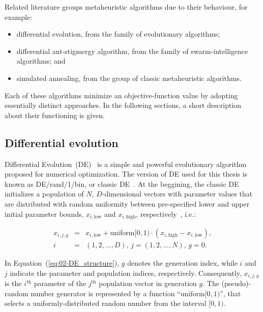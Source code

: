 \bigskip{}


Related literature groups metaheuristic algorithms due to their behaviour,
for example:
\begin{itemize}
\item differential evolution, from the family of evolutionary algorithms;
\item differential ant-stigmergy algorithm, from the family of swarm-intelligence
algorithms; and
\item simulated annealing, from the group of classic metaheuristic algorithms. 
\end{itemize}
Each of these algorithms minimize an objective-function value by adopting
essentially distinct approaches. In the following sections, a short
description about their functioning is given.


\subsection{Differential evolution \label{sub:02-DE}}

Differential Evolution~(DE)~\cite{storn1997_Differential_evolution}
is a simple and powerful evolutionary algorithm proposed for numerical
optimization. The version of DE used for this thesis is known as DE/rand/1/bin,
or \textquotedbl{}classic DE\textquotedbl{}~\cite{Price-Differential_evolution_a_practical_approach:2005}.
At the beggining, the classic DE initializes a population of $N$,
$D$-dimensional vectors with parameter values that are distributed
with random uniformity between pre-specified lower and upper initial
parameter bounds, $x_{i,\mathrm{{low}}}$ and $x_{i,\mathrm{{high}}}$,
respectively~\cite{Ronkkonen-Real_parameter_optimization_with_differential_evolution:2005},
i.e.:

\begin{eqnarray}
x_{i,j,g} & = & x_{i,\mathrm{{low}}}+\mathrm{{uniform}[0,1)}\cdot(x_{i,\mathrm{{high}}}-x_{i,\mathrm{{low}}}),\nonumber \\
i & = & (1,2,...,D),\, j=(1,2,...,N),\, g=0.\label{eq:02-DE_structure}
\end{eqnarray}


\noindent In Equation~(\ref{eq:02-DE_structure}), $g$ denotes the
generation index, while $i$ and $j$ indicate the parameter and population
indices, respectively. Consequently, $x_{i,j,g}$ is the $i^{\mathrm{th}}$
parameter of the $j^{\mathrm{th}}$ population vector in generation
$g$. The (pseudo)-random number generator is represented by a function
``$\mathrm{{uniform}[0,1)}$'', that selects a uniformly-distributed
random number from the interval $[0,1)$.

